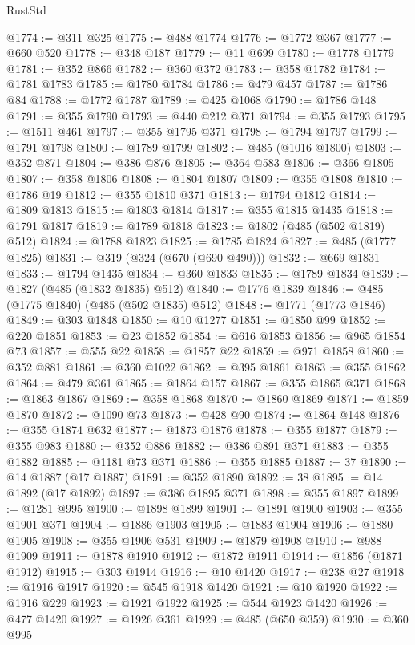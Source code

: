 \begin{lexlean}{RustStd}
\begin{coremodule}
@1774 := @311 @325
@1775 := @488 @1774
@1776 := @1772 @367
@1777 := @660 @520
@1778 := @348 @187
@1779 := @11 @699
@1780 := @1778 @1779
@1781 := @352 @866
@1782 := @360 @372
@1783 := @358 @1782
@1784 := @1781 @1783
@1785 := @1780 @1784
@1786 := @479 @457
@1787 := @1786 @84
@1788 := @1772 @1787
@1789 := @425 @1068
@1790 := @1786 @148
@1791 := @355 @1790
@1793 := @440 @212 @371
@1794 := @355 @1793
@1795 := @1511 @461
@1797 := @355 @1795 @371
@1798 := @1794 @1797
@1799 := @1791 @1798
@1800 := @1789 @1799
@1802 := @485 (@1016 @1800)
@1803 := @352 @871
@1804 := @386 @876
@1805 := @364 @583
@1806 := @366 @1805
@1807 := @358 @1806
@1808 := @1804 @1807
@1809 := @355 @1808
@1810 := @1786 @19
@1812 := @355 @1810 @371
@1813 := @1794 @1812
@1814 := @1809 @1813
@1815 := @1803 @1814
@1817 := @355 @1815 @1435
@1818 := @1791 @1817
@1819 := @1789 @1818
@1823 := @1802 (@485 (@502 @1819) @512)
@1824 := @1788 @1823
@1825 := @1785 @1824
@1827 := @485 (@1777 @1825)
@1831 := @319 (@324 (@670 (@690 @490)))
@1832 := @669 @1831
@1833 := @1794 @1435
@1834 := @360 @1833
@1835 := @1789 @1834
@1839 := @1827 (@485 (@1832 @1835) @512)
@1840 := @1776 @1839
@1846 := @485 (@1775 @1840) (@485 (@502 @1835) @512)
@1848 := @1771 (@1773 @1846)
@1849 := @303 @1848
@1850 := @10 @1277
@1851 := @1850 @99
@1852 := @220 @1851
@1853 := @23 @1852
@1854 := @616 @1853
@1856 := @965 @1854 @73
@1857 := @555 @22
@1858 := @1857 @22
@1859 := @971 @1858
@1860 := @352 @881
@1861 := @360 @1022
@1862 := @395 @1861
@1863 := @355 @1862
@1864 := @479 @361
@1865 := @1864 @157
@1867 := @355 @1865 @371
@1868 := @1863 @1867
@1869 := @358 @1868
@1870 := @1860 @1869
@1871 := @1859 @1870
@1872 := @1090 @73
@1873 := @428 @90
@1874 := @1864 @148
@1876 := @355 @1874 @632
@1877 := @1873 @1876
@1878 := @355 @1877
@1879 := @355 @983
@1880 := @352 @886
@1882 := @386 @891 @371
@1883 := @355 @1882
@1885 := @1181 @73 @371
@1886 := @355 @1885
@1887 := 37
@1890 := @14 @1887 (@17 @1887)
@1891 := @352 @1890
@1892 := 38
@1895 := @14 @1892 (@17 @1892)
@1897 := @386 @1895 @371
@1898 := @355 @1897
@1899 := @1281 @995
@1900 := @1898 @1899
@1901 := @1891 @1900
@1903 := @355 @1901 @371
@1904 := @1886 @1903
@1905 := @1883 @1904
@1906 := @1880 @1905
@1908 := @355 @1906 @531
@1909 := @1879 @1908
@1910 := @988 @1909
@1911 := @1878 @1910
@1912 := @1872 @1911
@1914 := @1856 (@1871 @1912)
@1915 := @303 @1914
@1916 := @10 @1420
@1917 := @238 @27
@1918 := @1916 @1917
@1920 := @545 @1918 @1420
@1921 := @10 @1920
@1922 := @1916 @229
@1923 := @1921 @1922
@1925 := @544 @1923 @1420
@1926 := @477 @1420
@1927 := @1926 @361
@1929 := @485 (@650 @359)
@1930 := @360 @995

\end{coremodule}
\end{lexlean}
